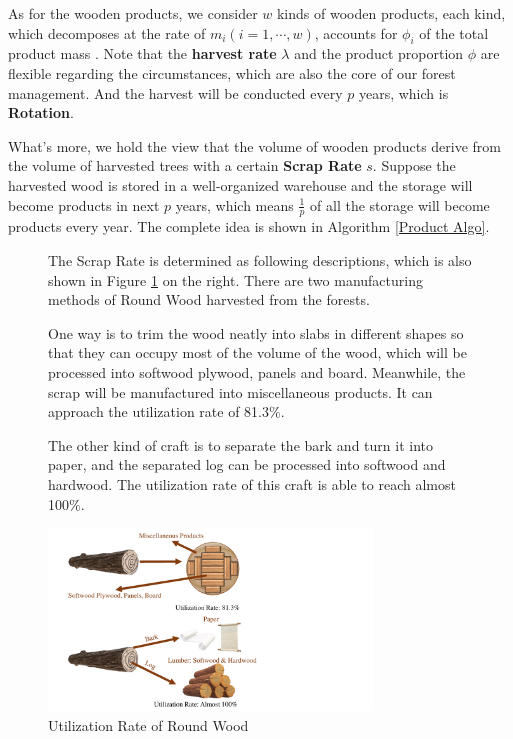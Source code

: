 \documentclass{mcmthesis}
\numberwithin{figure}{section}
\numberwithin{table}{section}
\numberwithin{equation}{section}
\begin{document}
  \par
  As for the wooden products, we consider $ w $ kinds of wooden products, each kind,
which decomposes at the rate of $ m_i (i = 1,\cdots, w) $, accounts for $ \phi_i$ 
of the total product mass \citep{2006Forest}. Note that the \textbf{harvest rate} $ \lambda $ and the product
proportion $ \phi $ are flexible regarding the circumstances, which are also 
the core of our forest management. And the harvest will be conducted every 
$ p $ years, which is \textbf{Rotation}. 
\par
What's more, we hold the view that 
the volume of wooden products derive from the volume of harvested trees with a certain
\textbf{Scrap Rate} $ s $. Suppose the harvested wood is stored in a well-organized
warehouse and the storage will become products in next $ p $ years, which means 
 $ \frac{1}{p} $ of all the storage will become products every year.
The complete idea is shown in Algorithm \ref{Product Algo}.


\begin{figure}[htbp]
  \begin{minipage}[htbp]{0.42\linewidth}
    The Scrap Rate is determined as following descriptions, which is also shown 
    in Figure \ref{RoundWood} on the right. There are two 
    manufacturing methods of Round Wood harvested from the forests. 
    \par
    One way is to trim the wood neatly into slabs in different shapes so that they can
    occupy most of the volume of the wood, which will be processed into softwood plywood, 
    panels and board. Meanwhile, the scrap will be manufactured into miscellaneous 
    products. It can approach the utilization rate of 81.3\%.
    \par
    The other kind of craft is to separate the bark and turn it into paper, and 
    the separated log can be processed into softwood and hardwood. The utilization 
    rate of this craft is able to reach almost 100\%.
  \end{minipage}
  \hfill
  \begin{minipage}[htbp]{0.5\linewidth}
    \begin{flushright}
      \includegraphics[width = 8.61cm]{code&pic/Roundwood cutting ways.pdf}
      \caption{Utilization Rate of Round Wood}\label{RoundWood}
    \end{flushright}
  \end{minipage}
\end{figure}
\end{document}

